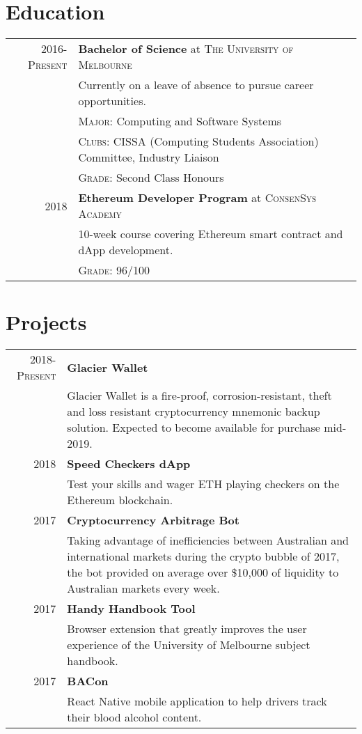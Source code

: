 \documentclass[a4paper,10pt]{article}
\begin{document}
\section{Education}
\begin{tabular}{rl}	
    \textsc{2016-Present} & \textbf{Bachelor of Science} at \textsc{The University of Melbourne}\\
    & Currently on a leave of absence to pursue career opportunities.\\
    & \textsc{Major:} Computing and Software Systems\\
    & \textsc{Clubs:} CISSA (Computing Students Association) Committee, Industry Liaison\\
    & \textsc{Grade:} Second Class Honours\\
    \textsc{2018} & \textbf{Ethereum Developer Program} at \textsc{ConsenSys Academy}\\
    & 10-week course covering Ethereum smart contract and dApp development.\\
    & \textsc{Grade:} 96/100
\end{tabular}
\section{Projects}
\begin{tabular}{rp{13.5cm}}	
    \textsc{2018-Present} & \textbf{Glacier Wallet}\\
    & Glacier Wallet is a fire-proof, corrosion-resistant, theft and loss resistant cryptocurrency mnemonic backup solution. Expected to become available for purchase mid-2019.\\
    \textsc{2018} & \textbf{Speed Checkers dApp}\\
    & Test your skills and wager ETH playing checkers on the Ethereum blockchain.\\
    \textsc{2017} & \textbf{Cryptocurrency Arbitrage Bot}\\
    & Taking advantage of inefficiencies between Australian and international markets during the crypto bubble of 2017, the bot provided on average over \$10,000 of liquidity to Australian markets every week.\\
    2017 & \textbf{Handy Handbook Tool}\\
    & Browser extension that greatly improves the user experience of the University of Melbourne subject handbook.\\
    \textsc{2017} & \textbf{BACon}\\
    & React Native mobile application to help drivers track their blood alcohol content.
\end{tabular}
\end{document}
